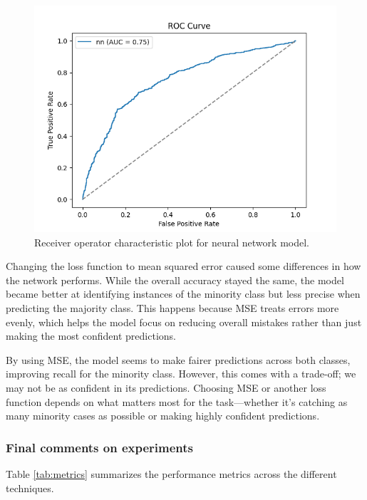 \begin{figure}[H]
	\centering
	\includegraphics[width=0.7\linewidth]{img/nn_roc}
	\caption{Receiver operator characteristic plot for neural network model.}
	\label{fig:nnroc}
\end{figure}


Changing the loss function to mean squared error caused some differences in how the network performs. While the overall accuracy stayed the same, the model became better at identifying instances of the minority class but less precise when predicting the majority class. This happens because MSE treats errors more evenly, which helps the model focus on reducing overall mistakes rather than just making the most confident predictions.

By using MSE, the model seems to make fairer predictions across both classes, improving recall for the minority class. However, this comes with a trade-off; we may not be as confident in its predictions. Choosing MSE or another loss function depends on what matters most for the task—whether it's catching as many minority cases as possible or making highly confident predictions.

\subsubsection{Final comments on experiments}

Table \ref{tab:metrics} summarizes the performance metrics across the different techniques.


